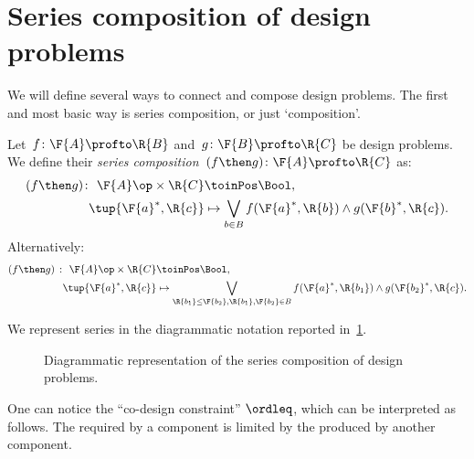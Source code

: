 \section{Series composition of design problems}

We will define several ways to connect and compose design problems. The first and most basic way is series composition, or just `composition'.

\begin{definition}
  \label{def:dp-series}
  Let~$f \colon  \F{A} \profto \R{B}$ and~$g \colon \F{B} \profto \R{C}$ be design problems. We define their \emph{series composition}~$(f\then g) \colon  \F{A} \profto \R{C}$ as:
  \begin{equation}
    \label{eq:composition2}
    \begin{aligned}
    (f \then g)
      \colon \ \F{A}\op \times \R{C} & \toinPos  \Bool, \\
      \tup{\F{a}^*, \R{c}} &\mapsto \bigvee_{b\in B} f(\F{a}^*,\R{b}) \wedge g(\F{b}^*,\R{c}).
    \end{aligned}
  \end{equation}
  Alternatively:
  \begin{equation}
    \begin{aligned}
      \label{eq:composition}
      (f \then g)\  \colon \ \F{A}\op \times \R{C} & \toinPos  \Bool,  \\
      \tup{\F{a}^*, \R{c}} &\mapsto \bigvee_{\R{b_1}\leq\F{b_2}, \R{b_1},\F{b_2}\in B} f(\F{a}^*,\R{b_1}) \wedge g(\F{b_2}^*,\R{c}).
    \end{aligned}
  \end{equation}
\end{definition}
We represent series in the diagrammatic notation reported in~\cref{fig:compositiondiagram}.

\begin{figure}[h!]
  \begin{center}
  \end{center}
  \caption{Diagrammatic representation of the series composition of design problems. \label{fig:compositiondiagram}}
\end{figure}

One can notice the ``co-design constraint'' $\ordleq$, which can be interpreted as follows.
The  required by a component is limited by the  produced by another component.


